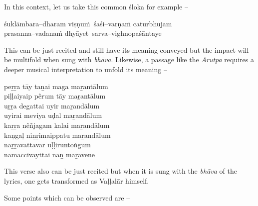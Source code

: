 In this context, let us take this common śloka for example –

\begin{myquote}
śuklāmbara–dharam viṣṇuṁ śaśi–varṇaṁ caturbhujam \\ prasanna–vadanaṁ dhyāyet sarva–vighnopaśāntaye  
\end{myquote}

This can be just recited and still have its meaning conveyed but the impact will be multifold when sung with \textit{bhāva}. Likewise, a passage like the \textit{Arutpa} requires a deeper musical interpretation to unfold its meaning –

\begin{myquote}
\end{myquote}

\begin{myquote}
peṟṟa tāy taṉai maga maṟantālum\\ piḷḷaiyaip pêrum tāy maṟantālum\\ uṟṟa degattai uyir maṟandālum\\ uyirai meviya uḍal maṟandālum\\ kaṟṟa nêñjagam kalai maṟandālum\\ kaṇgaḷ niṉṟimaippatu maṟandālum\\ naṟṟavattavar uḷḷiruntoṅgum\\ namaccivāyttai nāṉ maṟavene
\end{myquote}

This verse also can be just recited but when it is sung with the \textit{bhāva} of the lyrics, one gets transformed as Vaḷḷalār himself.

Some points which can be observed are –

\vspace{-.3cm}

